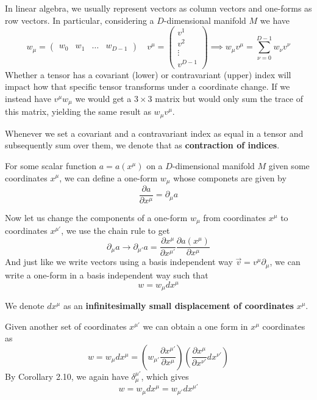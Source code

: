\documentclass{article}
\begin{document}
 			In linear algebra, we usually represent vectors as column vectors and one-forms as row vectors. In particular, considering a $D$-dimensional manifold $M$ we have
 			$$ w_\mu = \begin{pmatrix} w_0 & w_1 & \dots & w_{D-1}\end{pmatrix} \quad v^\mu = \begin{pmatrix}
 				v^1 \\
 				v^2 \\
 				\vdots \\
 				v^{D-1}
 			\end{pmatrix} \implies  w_\mu v^\mu = \sum_{\nu=0}^{D-1} w_\nu v^\nu$$
 			Whether a tensor has a covariant (lower) or contravariant (upper) index will impact how that specific tensor transforms under a coordinate change. If we instead have $v^\mu w_\mu$ we would get a $3\times3$ matrix but would only sum the trace of this matrix, yielding the same result as $w_\mu v^\mu$.
 			
 			\begin{defn}
 				Whenever we set a covariant and a contravariant index as equal in a tensor and subsequently sum over them, we denote that as \textbf{contraction of indices}.
 			\end{defn}
 			\begin{thm}
 				For some scalar function $a=a(x^\mu)$ on a $D$-dimensional manifold $M$ given some coordinates $x^\mu$, we can define a one-form $w_\mu$ whose componets are given by
 				\begin{equation}
 					\label{eq:OneForm}
 					\boxed{\frac{\partial a}{\partial x^\mu} = \partial_\mu a}
 				\end{equation}
 			\end{thm} \noindent
 			Now let us change the components of a one-form $w_\mu$ from coordinates $x^\mu$ to coordinates $x^{\mu'}$, we use the chain rule to get
 			$$ \partial_\mu a \to \partial_{\mu'} a = \frac{\partial x^\mu}{\partial x^{\mu'}} \frac{\partial a(x^\mu)}{\partial x^\mu} $$
 			And just like we write vectors using a basis independent way $\vec{v} = v^\mu \partial_\mu$, we can write a one-form in a basis independent way such that
 			$$ w = w_\mu dx^\mu$$
 			\begin{defn}
 				We denote $dx^\mu$ as an \textbf{infinitesimally small displacement of coordinates} $x^\mu$.
 			\end{defn} \noindent
 			Given another set of coordinates $x^{\mu'}$ we can obtain a one form in $x^\mu$ coordinates as
 			$$ w = w_\mu dx^\mu = \left( w_{\mu'} \frac{\partial x^{\mu'}}{\partial x^\mu} \right) \left( \frac{\partial x^\mu}{\partial x^{\nu'}} dx^{\nu'} \right)$$
 			By Corollary 2.10, we again have $\delta_\mu^{\mu'}$, which gives
 			$$ w = w_\mu dx^\mu = w_{\mu'} dx^{\mu'}  $$
 			
\end{document}
